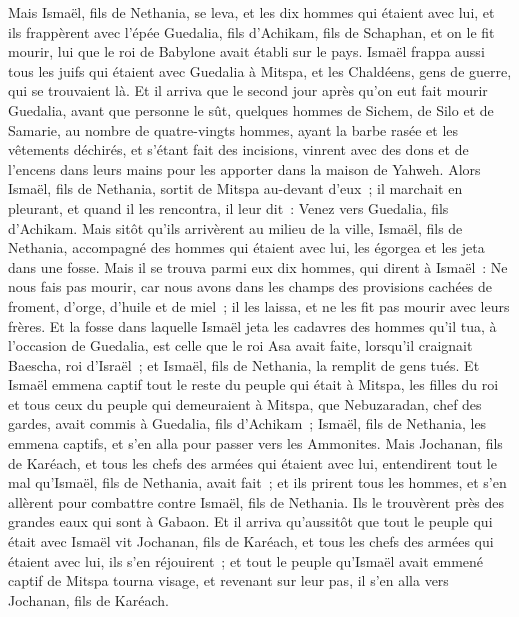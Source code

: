 \begin{multicols}{2}
Mais Ismaël, fils de Nethania, se leva, et les dix hommes qui étaient avec lui, et ils frappèrent avec l'épée Guedalia, fils d'Achikam, fils de Schaphan, et on le fit mourir, lui que le roi de Babylone avait établi sur le pays.
Ismaël frappa aussi tous les juifs qui étaient avec Guedalia à Mitspa, et les Chaldéens, gens de guerre, qui se trouvaient là.
Et il arriva que le second jour après qu'on eut fait mourir Guedalia, avant que personne le sût,
quelques hommes de Sichem, de Silo et de Samarie, au nombre de quatre-vingts hommes, ayant la barbe rasée et les vêtements déchirés, et s'étant fait des incisions, vinrent avec des dons et de l'encens dans leurs mains pour les apporter dans la maison de Yahweh.
Alors Ismaël, fils de Nethania, sortit de Mitspa au-devant d'eux~; il marchait en pleurant, et quand il les rencontra, il leur dit~: Venez vers Guedalia, fils d'Achikam.
Mais sitôt qu'ils arrivèrent au milieu de la ville, Ismaël, fils de Nethania, accompagné des hommes qui étaient avec lui, les égorgea et les jeta dans une fosse.
Mais il se trouva parmi eux dix hommes, qui dirent à Ismaël~: Ne nous fais pas mourir, car nous avons dans les champs des provisions cachées de froment, d'orge, d'huile et de miel~; il les laissa, et ne les fit pas mourir avec leurs frères.
 Et la fosse dans laquelle Ismaël jeta les cadavres des hommes qu'il tua, à l'occasion de Guedalia, est celle que le roi Asa avait faite, lorsqu'il craignait Baescha, roi d'Israël~; et Ismaël, fils de Nethania, la remplit de gens tués.
Et Ismaël emmena captif tout le reste du peuple qui était à Mitspa, les filles du roi et tous ceux du peuple qui demeuraient à Mitspa, que Nebuzaradan, chef des gardes, avait commis à Guedalia, fils d'Achikam~; Ismaël, fils de Nethania, les emmena captifs, et s'en alla pour passer vers les Ammonites.
Mais Jochanan, fils de Karéach, et tous les chefs des armées qui étaient avec lui, entendirent tout le mal qu'Ismaël, fils de Nethania, avait fait~;
et ils prirent tous les hommes, et s'en allèrent pour combattre contre Ismaël, fils de Nethania. Ils le trouvèrent près des grandes eaux qui sont à Gabaon.
Et il arriva qu'aussitôt que tout le peuple qui était avec Ismaël vit Jochanan, fils de Karéach, et tous les chefs des armées qui étaient avec lui, ils s'en réjouirent~;
et tout le peuple qu'Ismaël avait emmené captif de Mitspa tourna visage, et revenant sur leur pas, il s'en alla vers Jochanan, fils de Karéach.

\end{multicols}
